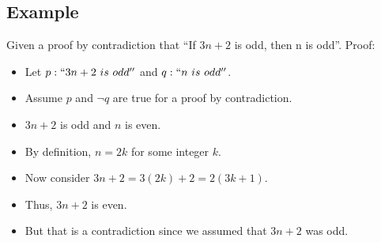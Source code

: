 \documentclass{math}
\begin{document}
\subsection*{Example}
Given a proof by contradiction that ``If \( 3n+2 \) is odd, then n is odd''.
Proof:
\begin{itemize}
  \item Let \( p: ``3n+2\ is\ odd'' \) and \( q: ``n\ is\ odd'' \).
  \item Assume \( p \) and \( \neg{q} \) are true for a proof by contradiction.
  \item \( 3n+2 \) is odd and \( n \) is even.
  \item By definition, \( n = 2k \) for some integer \( k \).
  \item Now consider \( 3n+2 = 3(2k)+2 = 2(3k+1) \).
  \item Thus, \( 3n+2 \) is even.
  \item But that is a contradiction since we assumed that \( 3n+2 \) was odd.
\end{itemize}
\end{document}
